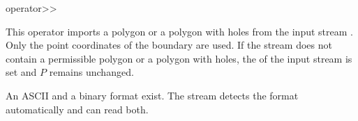
\ccHtmlNoClassLinks
\begin{ccRefFunction}{operator>>}
\label{refPolygon_with_holes_operator_rightshift}

\ccDefinition

This operator imports a polygon or a polygon with holes from the input
stream . Only the point coordinates of the boundary are used.
If the stream  does not contain a permissible polygon or a
polygon with holes, the  of the input stream 
is set and $P$ remains unchanged.

An ASCII and a binary format exist. The stream detects the
format automatically and can read both.





\ccSeeAlso

\\ 
\\ 


\end{ccRefFunction}

